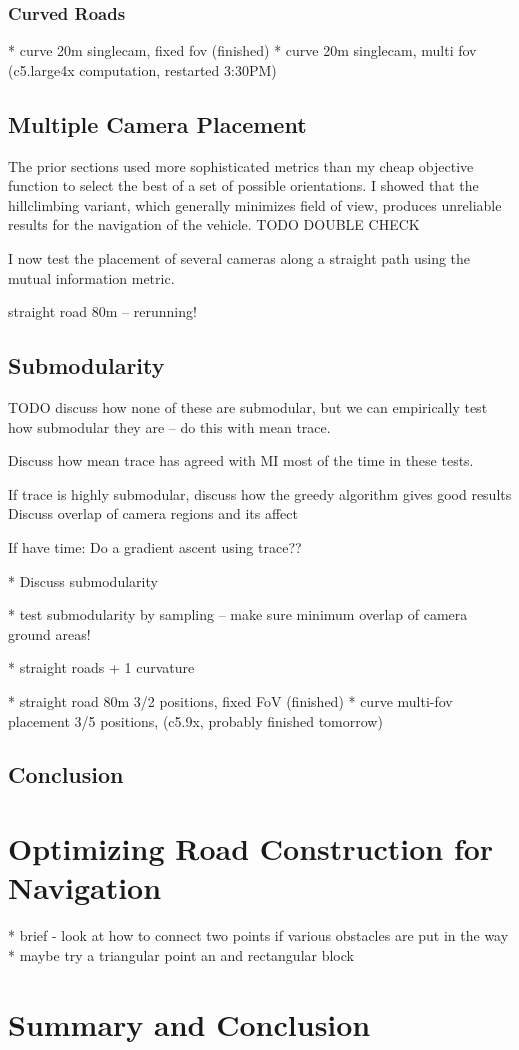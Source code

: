 \documentclass[a4paper,12pt,twoside,openright]{report}
\begin{document}
\subsection{Curved Roads}

* curve 20m singlecam, fixed fov (finished)
* curve 20m singlecam, multi fov (c5.large4x computation, restarted 3:30PM)

\section{Multiple Camera Placement}

The prior sections used more sophisticated metrics than my cheap objective function
to select the best of a set of possible orientations. I showed that the
hillclimbing variant, which generally minimizes field of view, produces unreliable
results for the navigation of the vehicle. TODO DOUBLE CHECK 

I now test the placement of several cameras along a straight path using
the mutual information metric.

straight road 80m -- rerunning!


\section{Submodularity}

TODO discuss how none of these are submodular, but we can empirically
test how submodular they are -- do this with mean trace.

Discuss how mean trace has agreed with MI most of the time in these tests.

If trace is highly submodular, discuss how the greedy algorithm gives good results
Discuss overlap of camera regions and its affect

If have time: Do a gradient ascent using trace??



* Discuss submodularity

* test submodularity by sampling -- make sure minimum overlap of camera ground areas!

* straight roads + 1 curvature



* straight road 80m 3/2 positions, fixed FoV (finished)
* curve multi-fov placement 3/5 positions, (c5.9x, probably finished tomorrow)



\section{Conclusion}

\chapter{Optimizing Road Construction for Navigation}

* brief - look at how to connect two points if various obstacles are put in the way
* maybe try a triangular point an and rectangular block 


\chapter{Summary and Conclusion} 




\appendix
\singlespacing

\printbibliography
\end{document}
